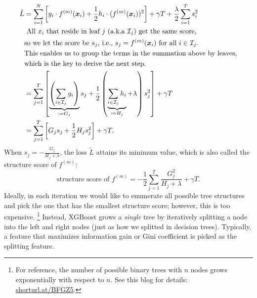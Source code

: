             \begin{equation}
                \begin{aligned}
                    \tilde{L} & = \sum_{i=1}^{N}{
                        \left[
                            g_i \cdot f^{(m)}(\bm{x}_i) + \frac{1}{2} h_i \cdot (f^{(m)}(\bm{x}_i))^2 
                        \right] + \gamma T + \frac{\lambda}{2}\sum_{i=1}^{T}{s_i^2}
                    } \\
                    & \text{
                    All $x_i$ that reside in leaf $j$ (a.k.a  $\mathcal{I}_j$) get the same score,} \\
                    & \text{so we let the score be $s_j$, i.e., $s_j = f^{(m)}(\bm{x}_i)$ for all $i \in \mathcal{I}_j$.} \\
                    & \text{This enables us to group the terms in the summation above by leaves,} \\
                    & \text{which is the key to derive the next step.} \\
                    & = \sum_{j=1}^{T}{
                        \left[ \underbrace{\left(\sum_{i \in \mathcal{I}_j}^{}{g_i} \right)}_{:=G_j} s_j + \frac{1}{2}\left( \underbrace{\sum_{i \in \mathcal{I}_j}^{}{h_i}}_{:=H_j} + \lambda \right)s_j^2
                        \right] + \gamma T 
                    } \\
                    & = \sum_{j=1}^{T}{ \left[ G_j s_j + \frac{1}{2} H_j s_j^2 \right] } + \gamma T.
                \end{aligned}
            \end{equation}
        When $s_j = -\frac{G_j}{H_j + \lambda}$, the loss $\tilde{L}$ attains its minimum value, which is also called the structure score of $f^{(m)}$:
            \begin{equation}
                \text{structure score of $f^{(m)}$}= -\frac{1}{2}\sum_{j=1}^{T}{\frac{G_j^2}{H_j + \lambda}} + \gamma T.
            \end{equation}
        Ideally, in each iteration we would like to enumerate all possible tree structures and pick the one that has the smallest structure score; however, this is too expensive. \footnote{For reference, the number of possible binary trees with $n$ nodes grows exponentially with respect to $n$. See this blog for details: \url{shorturl.at/BFGZ5}.}
        Instead, XGBoost grows a \emph{single} tree by iteratively splitting a node into the left and right nodes (just as how we splitted in decision trees).
        Typically, a feature that maximizes information gain or Gini coefficient is picked as the splitting feature.
